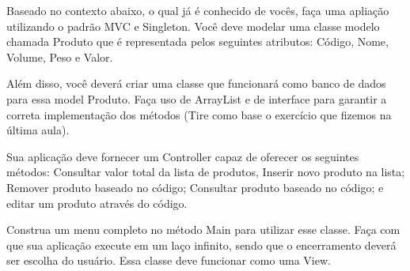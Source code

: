 Baseado no contexto abaixo, o qual já é conhecido de vocês, faça uma apliação utilizando o padrão MVC e Singleton.
Você deve modelar uma classe modelo chamada Produto que é representada pelos seguintes atributos: Código, Nome, Volume, Peso e Valor.

Além disso, você deverá criar uma classe que funcionará como banco de dados para essa model Produto. Faça uso de ArrayList e de interface para garantir a correta implementação dos métodos (Tire como base o exercício que fizemos na última aula).

Sua aplicação deve fornecer um Controller capaz de oferecer os seguintes métodos: Consultar valor total da lista de produtos, Inserir novo produto na lista; Remover produto baseado no código; Consultar produto baseado no código; e editar um produto através do código.


Construa um menu completo no método Main para utilizar esse classe. Faça com que sua aplicação execute em um laço infinito, sendo que o encerramento deverá ser escolha do usuário. Essa classe deve funcionar como uma View.